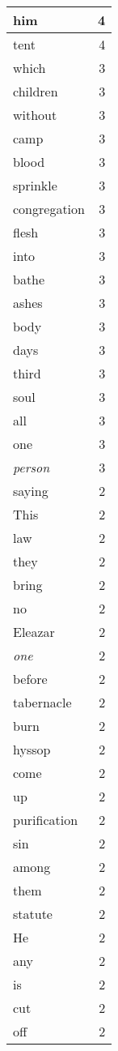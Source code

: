 \begin{center}
\begin{longtable}{l|r}
him & 4 \\ \hline
tent & 4 \\ \hline
which & 3 \\ \hline
children & 3 \\ \hline
without & 3 \\ \hline
camp & 3 \\ \hline
blood & 3 \\ \hline
sprinkle & 3 \\ \hline
congregation & 3 \\ \hline
flesh & 3 \\ \hline
into & 3 \\ \hline
bathe & 3 \\ \hline
ashes & 3 \\ \hline
body & 3 \\ \hline
days & 3 \\ \hline
third & 3 \\ \hline
soul & 3 \\ \hline
all & 3 \\ \hline
one & 3 \\ \hline
\emph{person} & 3 \\ \hline
saying & 2 \\ \hline
This & 2 \\ \hline
law & 2 \\ \hline
they & 2 \\ \hline
bring & 2 \\ \hline
no & 2 \\ \hline
Eleazar & 2 \\ \hline
\emph{one} & 2 \\ \hline
before & 2 \\ \hline
tabernacle & 2 \\ \hline
burn & 2 \\ \hline
hyssop & 2 \\ \hline
come & 2 \\ \hline
up & 2 \\ \hline
purification & 2 \\ \hline
sin & 2 \\ \hline
among & 2 \\ \hline
them & 2 \\ \hline
statute & 2 \\ \hline
He & 2 \\ \hline
any & 2 \\ \hline
is & 2 \\ \hline
cut & 2 \\ \hline
off & 2 \\ \hline

\end{longtable}
\end{center}

